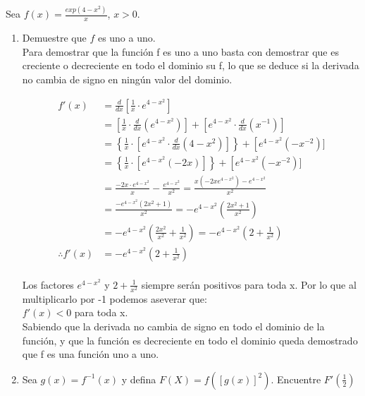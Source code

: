 \documentclass[12pt]{article}
\begin{document}
Sea $f(x)=\frac{exp(4-x^2)}{x}$, $x>0$.
\begin{enumerate}
\item Demuestre que $f$ es uno a uno. \\
Para demostrar que la función f es uno a uno basta con demostrar que es creciente o decreciente en todo el dominio su f, lo que se deduce si la derivada no cambia de signo en ningún valor del dominio.

\begin{equation*}
  \begin{split}
    f'(x)
    &=  \frac{d}{dx} \left[\frac{1}{x} \cdot e^{4-x^2}\right] \\
    &= \left[\frac {1}{x}\cdot \frac{d}{dx}(e^{4-x^2}) \right] + \left[e^{4-x^2}\cdot \frac{d}{dx}(x^{-1})\right] \\
    &= \left\lbrace \frac{1}{x} \cdot \left[e^{4-x^2} \cdot \frac{d}{dx}(4-x^2) \right] \right\rbrace + \left[e^{4-x^2}(-x^{-2})] \\
    &=  \left\lbrace \frac{1}{x} \cdot \left[e^{4-x^2} ( -2x) \right] \right\rbrace + \left[e^{4-x^2}(-x^{-2})] \\
    &= \frac{-2x \cdot e^{4-x^2}}{x} - \frac {e^{4-x^2}}{x^{2}}= \frac{x(-2x  e^{4-x^2})- e^{4-x^2} }{x^2}\\
    &= \frac{-e^{4-x^2} (2x^{2}+1) }{x^2} = -e^{4-x^2} ( \frac{2x^{2}+1}{x^2} )\\
     &=  -e^{4-x^2}( \frac{2x^{2}}{x^2} +\frac{1}{x^2}) =   -e^{4-x^2} (2 +\frac{1}{x^2})\\
    \therefore
    f'(x) 
    & =  -e^{4-x^2} (2 +\frac{1}{x^2})  \\
  \end{split}
\end{equation*}

Los factores $ e^{4-x^2}$  y  $2 +\frac{1}{x^2}$ siempre serán positivos para toda x. Por lo que al multiplicarlo por -1 podemos aseverar que: \\
  $f'(x) <0 $ para toda x.\\
  Sabiendo que la derivada no cambia de signo en todo el dominio de la función, y que la función es decreciente en todo el dominio queda demostrado que f es una función uno a uno.\\
  
\item Sea $g(x)=f^{-1}(x)$ y defina $F(X)=f([g(x)]^2)$. Encuentre $F'\left(\frac{1}{2}\right)$
  

\end{enumerate}
\end{document}
